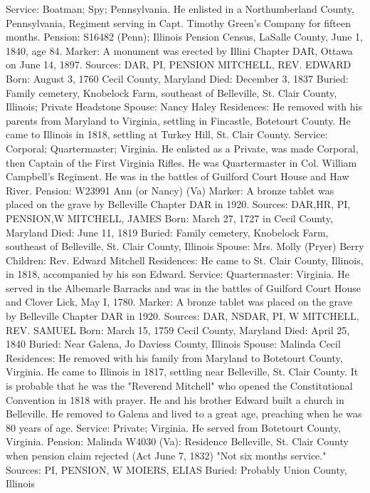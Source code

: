 Service: Boatman; Spy; Pennsylvania. He enlisted in a Northumberland County, Pennsylvania, Regiment serving in Capt. Timothy Green's Company for fif­teen months.
Pension: S16482 (Penn); Illinois Pension Census, LaSalle County, June 1, 1840, age 84.
Marker: A monument was erected by Illini Chapter DAR, Ottawa on June 14, 1897.
Sources: DAR, PI, PENSION  
MITCHELL, REV. EDWARD 
Born: August 3, 1760 Cecil County, Maryland 
Died: December 3, 1837 
Buried: Family cemetery, Knobelock Farm, southeast of Belleville, St. Clair County, Illinois; Private Headstone 
Spouse: Nancy Haley 
Residences: He removed with his parents from Maryland to Virginia, settling in Fincastle, Botetourt County. He came to Illinois in 1818, settling at Turkey Hill, St. Clair County. 
Service: Corporal; Quartermaster; Virginia. He enlisted as a Private, was made Corporal, then Captain of the First Virginia Rifles. He was Quartermaster in Col. William Campbell's Regiment. He was in the battles of Guilford Court House and Haw River. 
Pension: W23991 Ann (or Nancy) (Va)
Marker: A bronze tablet was placed on the grave by Belleville Chapter DAR in 1920.
Sources: DAR,HR, PI, PENSION,W 
MITCHELL, JAMES
Born: March 27, 1727 in Cecil County, Maryland
Died: June 11, 1819
Buried: Family cemetery, Knobelock Farm, southeast of Belleville, St. Clair County, Illinois
Spouse: Mrs. Molly (Pryer) Berry
Children: Rev. Edward Mitchell
Residences: He came to St. Clair County, Illinois, in 1818, accompanied by his son Edward.
Service: Quartermaster: Virginia. He served in the Albemarle Barracks and was in the battles of Guilford Court House and Clover Lick, May I, 1780.
Marker: A bronze tablet was placed on the grave by Belleville Chapter DAR in 1920.
Sources: DAR, NSDAR, PI, W 
MITCHELL, REV. SAMUEL 
Born: March 15, 1759 Cecil County, Maryland 
Died: April 25, 1840 
Buried: Near Galena, Jo Daviess County, Illinois 
Spouse: Malinda Cecil 
Residences: He removed with his family from Maryland to Botetourt County, Virginia. He came to Illinois in 1817, settling near Belleville, St. Clair County. It is probable that he was the "Reverend Mitchell" who opened the Consti­tutional Convention in 1818 with prayer. He and his brother Edward built a church in Belleville. He removed to Galena and lived to a great age, preach­ing when he was 80 years of age. 
Service: Private; Virginia. He served from Botetourt County, Virginia.
Pension: Malinda W4030 (Va): Residence Belleville, St. Clair County when pen­sion claim rejected (Act June 7, 1832) "Not six months service."
Sources: PI, PENSION, W 
MOIERS, ELIAS 
Buried: Probably Union County, Illinois 
